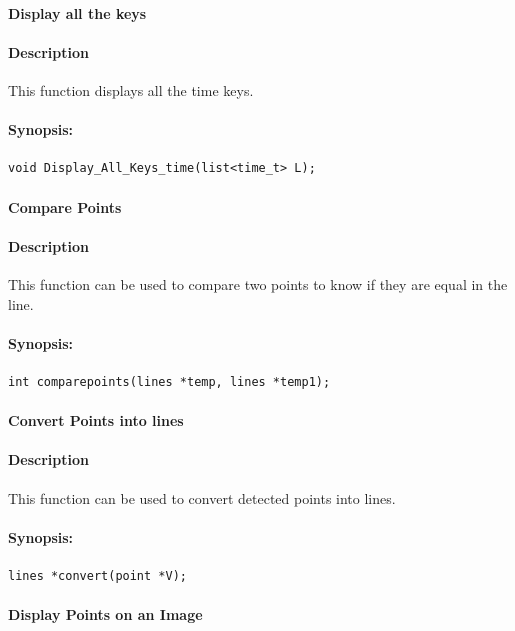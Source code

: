 \paragraph{Display all the keys}
\paragraph{Description}
This function displays all the time keys. 
\paragraph{Synopsis:}
\begin{lstlisting}
void Display_All_Keys_time(list<time_t> L);
\end{lstlisting}


\paragraph{Compare Points}
\paragraph{Description}
This function can be used to compare two points to know if they are equal in the line. 
\paragraph{Synopsis:}
\begin{lstlisting}
int comparepoints(lines *temp, lines *temp1);
\end{lstlisting}


\paragraph{Convert  Points into lines }
\paragraph{Description}
This function can be used to convert detected points into lines.
\paragraph{Synopsis:}
\begin{lstlisting}
lines *convert(point *V);
\end{lstlisting}



\paragraph{Display Points on an Image }

